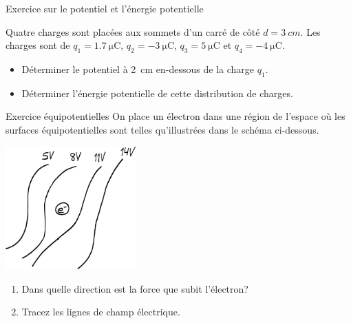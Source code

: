 \documentclass{beamer}
\begin{document}
\begin{frame}{Exercice sur le potentiel et l'énergie potentielle}

Quatre charges sont placées aux sommets d'un carré de côté $d = \SI{3}{cm}$. Les
charges sont de $q_1 = \SI{1.7}{\micro\coulomb}$, $q_2 = \SI{-3}{\micro\coulomb}$,
$q_3 = \SI{5}{\micro\coulomb}$ et $q_4 = \SI{-4}{\micro\coulomb}$.


\begin{itemize}
  \item Déterminer le potentiel à \SI{2}{cm} en-dessous de la charge $q_1$.
  \item Déterminer l'énergie potentielle de cette distribution de charges.
\end{itemize}

\begin{center}
\end{center}
\end{frame}



\begin{frame}{Exercice équipotentielles}
On place un électron dans une région de l'espace où les surfaces
équipotentielles sont telles qu'illustrées dans le schéma ci-dessous.

\begin{center}
  \includegraphics[width=5cm]{figures/exercice-equipotentielles.pdf}
\end{center}

\begin{enumerate}
  \item Dans quelle direction est la force que subit l'électron?
  \item Tracez les lignes de champ électrique.
\end{enumerate}
\end{frame}
\end{document}
